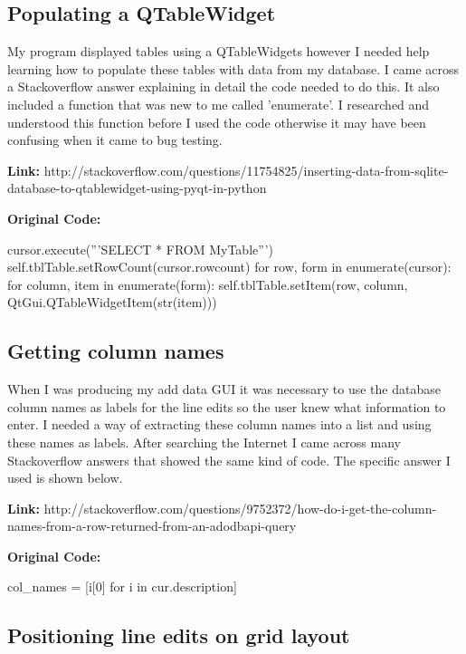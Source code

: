 \subsection{Populating a QTableWidget}

My program displayed tables using a QTableWidgets however I needed help learning how to populate these tables with data from my database. I came across a Stackoverflow answer explaining in detail the code needed to do this. It also included a function that was new to me called 'enumerate'. I researched and understood this function before I used the code otherwise it may have been confusing when it came to bug testing.

\textbf{Link:} http://stackoverflow.com/questions/11754825/inserting-data-from-sqlite-database-to-qtablewidget-using-pyqt-in-python

\textbf{Original Code:}

\begin{python}
cursor.execute('''SELECT * FROM MyTable''')
self.tblTable.setRowCount(cursor.rowcount)
for row, form in enumerate(cursor):
    for column, item in enumerate(form):
        self.tblTable.setItem(row, column, QtGui.QTableWidgetItem(str(item)))   
\end{python}

\subsection{Getting column names}

When I was producing my add data GUI it was necessary to use the database column names as labels for the line edits so the user knew what information to enter. I needed a way of extracting these column names into a list and using these names as labels. After searching the Internet I came across many Stackoverflow answers that showed the same kind of code. The specific answer I used is shown below.

\textbf{Link:} http://stackoverflow.com/questions/9752372/how-do-i-get-the-column-names-from-a-row-returned-from-an-adodbapi-query

\textbf{Original Code:}

\begin{python}
col_names = [i[0] for i in cur.description]
\end{python}

\subsection{Positioning line edits on grid layout}

